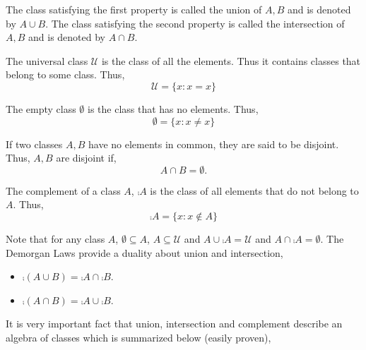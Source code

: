 The class satisfying the first property is called the union of $A,B$ and is denoted by $A \cup B$.
The class satisfying the second property is called the intersection of $A,B$ and is denoted by 
$A \cap B$.

\begin{Definition}
    The universal class $\mathcal{U}$ is the class of all the elements. Thus it contains classes
    that belong to some class. Thus, 
    \begin{equation*}
	\mathcal{U} = \left.\lbrace x : x = x \rbrace\right.
    \end{equation*}
\end{Definition}

\begin{Definition}
    The empty class $\emptyset$ is the class that has no elements. Thus,
    \begin{equation*}
	\emptyset = \left.\lbrace x : x \neq x \rbrace\right.
    \end{equation*}
\end{Definition}

\begin{Definition}
    If two classes $A,B$ have no elements in common, they are said to be disjoint. Thus, $A,B$ are
    disjoint if,
    \begin{equation*}
	A \cap B = \emptyset.
    \end{equation*}
\end{Definition}

\begin{Definition}
    The complement of a class $A$, $\comp{A}$ is the class of all elements that do not belong to $A$.
    Thus,
    \begin{equation*}
	\comp{A} =\left.\lbrace x : x \not\in A \rbrace\right.
    \end{equation*}
\end{Definition}

Note that for any class $A$, $\emptyset \subseteq A$, $A \subseteq \mathcal{U}$ and $A \cup
\comp{A} = \mathcal{U}$ and $A \cap \comp{A} = \emptyset$.
The Demorgan Laws provide a duality about union and intersection,
\begin{itemize}
    \item $\comp{(A \cup B)} = \comp{A} \cap \comp{B}$.
    \item $\comp{(A \cap B)} = \comp{A} \cup \comp{B}$.
\end{itemize}

It is very important fact that union, intersection and complement describe an algebra of classes
which is summarized below (easily proven),

